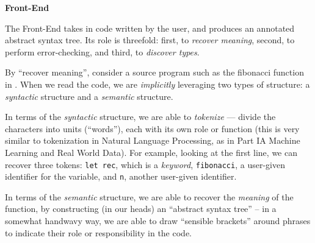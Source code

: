 \begin{minipage}[t]{0.15\textwidth}
    \textbf{\sffamily Front-End}
\end{minipage}%
\begin{minipage}[t]{0.85\textwidth}
    \setlength{\parskip}{.5\baselineskip}
    The Front-End takes in code written by the user, and produces an annotated abstract syntax tree. Its role is threefold: first, to \emph{recover meaning}, second, to perform error-checking, and third, to \emph{discover types}.

    By ``recover meaning'', consider a source program such as the fibonacci function in . When we read the code, we are \emph{implicitly} leveraging two types of structure: a \emph{syntactic} structure and a \emph{semantic} structure.

    In terms of the \emph{syntactic} structure, we are able to \emph{tokenize} --- divide the characters into units (``words''), each with its own role or function (this is very similar to tokenization in Natural Language Processing, as in {\sffamily Part IA Machine Learning and Real World Data}). For example, looking at the first line, we can recover three tokens: \texttt{let rec}, which is a \emph{keyword}, \texttt{fibonacci}, a user-given identifier for the variable, and \texttt{n}, another user-given identifier. 

    In terms of the \emph{semantic} structure, we are able to recover the \emph{meaning} of the function, by constructing (in our heads) an ``abstract syntax tree'' -- in a somewhat handwavy way, we are able to draw ``sensible brackets'' around phrases to indicate their role or responsibility in the code.
\end{minipage}

